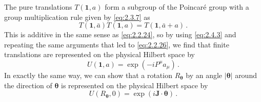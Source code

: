 The pure translations $T(\mathbf{1},a)$ form a subgroup of the Poincar\'e
group with a group multiplication rule given by \eqref{eq:2.3.7} as
\begin{equation}
T(\mathbf{1},\bar a)T(\mathbf{1},a)=T(\mathbf{1},\bar a+a)\,.
\tag{2.4.25}\label{eq:2.4.25}
\end{equation}
This is additive in the same sense as \eqref{eq:2.2.24}, so by using \eqref{eq:2.4.3} and
repeating the same arguments that led to \eqref{eq:2.2.26}, we find that finite
translations are represented on the physical Hilbert space by
\begin{equation}
U(\mathbf{1},a)=\exp(-iP^\mu a_\mu)\,.
\tag{2.4.26}\label{eq:2.4.26}
\end{equation}
In exactly the same way, we can show that a rotation $R_{\boldsymbol\theta}$ by
an angle $|\boldsymbol\theta|$ around the direction of $\boldsymbol\theta$ is
represented on the physical Hilbert space by
\begin{equation}
U(R_{\boldsymbol\theta},0)=\exp(i\mathbf{J}\cdot\boldsymbol\theta)\,.
\tag{2.4.27}\label{eq:2.4.27}
\end{equation}

